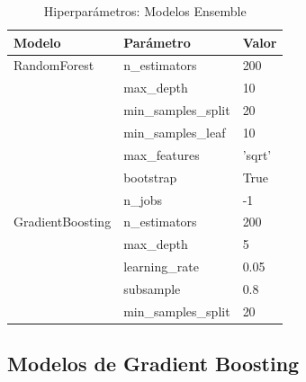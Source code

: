 \begin{table}[htbp]
\centering
\caption{Hiperpar\'ametros: Modelos Ensemble}
\label{tab:hyper_ensemble}
\small
\begin{tabular}{@{}llp{7cm}@{}}
\toprule
\textbf{Modelo} & \textbf{Par\'ametro} & \textbf{Valor} \\
\midrule
RandomForest & n\_estimators & 200 \\
 & max\_depth & 10 \\
 & min\_samples\_split & 20 \\
 & min\_samples\_leaf & 10 \\
 & max\_features & 'sqrt' \\
 & bootstrap & True \\
 & n\_jobs & -1 \\
\midrule
GradientBoosting & n\_estimators & 200 \\
 & max\_depth & 5 \\
 & learning\_rate & 0.05 \\
 & subsample & 0.8 \\
 & min\_samples\_split & 20 \\
\bottomrule
\end{tabular}
\end{table}

\subsection{Modelos de Gradient Boosting}
\label{app:gb_hyperparams}

